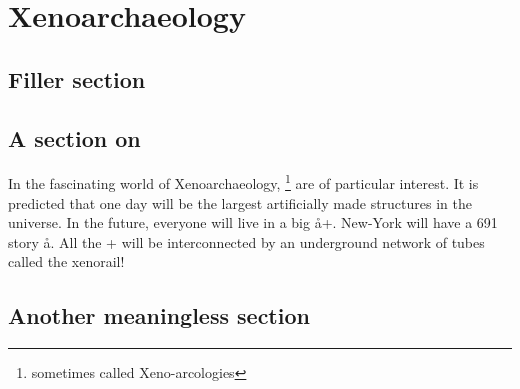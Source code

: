 \documentclass[a4paper,12pt,twoside,openright]{memoir}
\begin{document}
\glsunsetall
\tableofcontents

\glsresetall


\chapter{Xenoarchaeology}

\section{Filler section}
\kant*[1-2]

\section{A section on \AAs}
In the fascinating world of Xenoarchaeology, 
\AAs\footnote{sometimes called Xeno-arcologies} are of particular interest. It
is predicted that one day \AAs will be the largest artificially made structures
in the universe. In the future, everyone will live in a big \aa+. New-York will
have a 691 story \aa. All the \aas+ will be interconnected by an underground
network of tubes called the xenorail!


\section{Another meaningless section}
\kant*[3-4]

\printglossary
\end{document}
